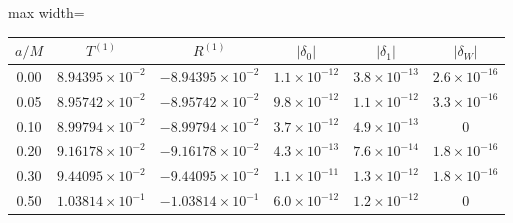 \documentclass[UTF8,fontset=fandol,11pt,a4paper]{ctexart}
\begin{document}
\par\addvspace{12pt}\noindent\begin{minipage}{\linewidth}
\centering\fontsize{9.5}{12}\selectfont\setlength{\tabcolsep}{3pt}\renewcommand{\arraystretch}{1.18}
\label{audit:tab:spin-limit}
\begin{adjustbox}{max width=\linewidth}
\begin{tabular}{c c c c c c}
\toprule
$a/M$ & $T^{(1)}$ & $R^{(1)}$ & $|\delta_0|$ & $|\delta_1|$ & $|\delta_W|$\\
\midrule
0.00 & $8.94395\times10^{-2}$ & $-8.94395\times10^{-2}$ & $1.1\times10^{-12}$ & $3.8\times10^{-13}$ & $2.6\times10^{-16}$\\
0.05 & $8.95742\times10^{-2}$ & $-8.95742\times10^{-2}$ & $9.8\times10^{-12}$ & $1.1\times10^{-12}$ & $3.3\times10^{-16}$\\
0.10 & $8.99794\times10^{-2}$ & $-8.99794\times10^{-2}$ & $3.7\times10^{-12}$ & $4.9\times10^{-13}$ & $0$\\
0.20 & $9.16178\times10^{-2}$ & $-9.16178\times10^{-2}$ & $4.3\times10^{-13}$ & $7.6\times10^{-14}$ & $1.8\times10^{-16}$\\
0.30 & $9.44095\times10^{-2}$ & $-9.44095\times10^{-2}$ & $1.1\times10^{-11}$ & $1.3\times10^{-12}$ & $1.8\times10^{-16}$\\
0.50 & $1.03814\times10^{-1}$ & $-1.03814\times10^{-1}$ & $6.0\times10^{-12}$ & $1.2\times10^{-12}$ & $0$\\
\bottomrule\end{tabular}\end{adjustbox}
\end{minipage}\par\addvspace{9pt}
\end{document}
